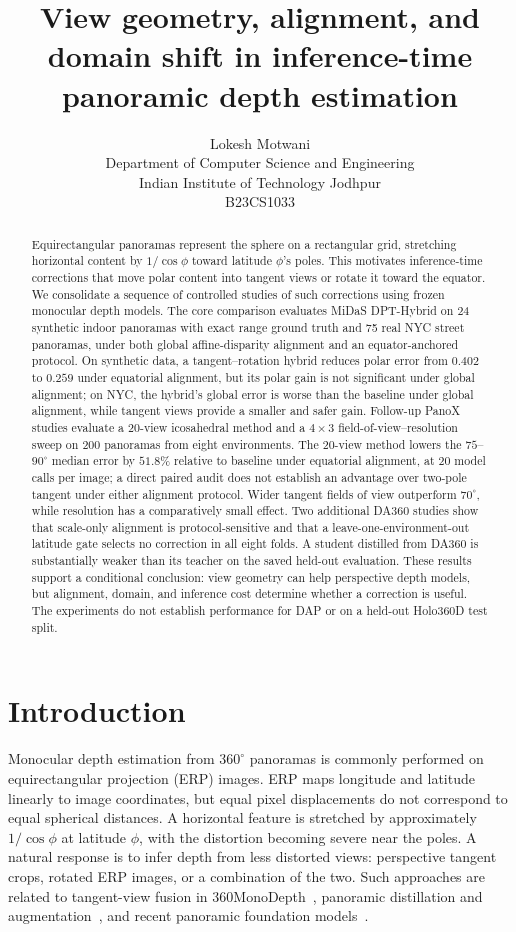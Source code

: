 \documentclass{article}
\title{View geometry, alignment, and domain shift in inference-time panoramic depth estimation}
\author{Lokesh Motwani \\
Department of Computer Science and Engineering \\
Indian Institute of Technology Jodhpur \\
B23CS1033}
\begin{document}
\maketitle

\begin{abstract}
Equirectangular panoramas represent the sphere on a rectangular grid, stretching horizontal content by $1/\cos\phi$ toward latitude $\phi$'s poles. This motivates inference-time corrections that move polar content into tangent views or rotate it toward the equator. We consolidate a sequence of controlled studies of such corrections using frozen monocular depth models. The core comparison evaluates MiDaS DPT-Hybrid on 24 synthetic indoor panoramas with exact range ground truth and 75 real NYC street panoramas, under both global affine-disparity alignment and an equator-anchored protocol. On synthetic data, a tangent--rotation hybrid reduces polar error from $0.402$ to $0.259$ under equatorial alignment, but its polar gain is not significant under global alignment; on NYC, the hybrid's global error is worse than the baseline under global alignment, while tangent views provide a smaller and safer gain. Follow-up PanoX studies evaluate a 20-view icosahedral method and a $4\times3$ field-of-view--resolution sweep on 200 panoramas from eight environments. The 20-view method lowers the $75$--$90^\circ$ median error by $51.8\%$ relative to baseline under equatorial alignment, at 20 model calls per image; a direct paired audit does not establish an advantage over two-pole tangent under either alignment protocol. Wider tangent fields of view outperform $70^\circ$, while resolution has a comparatively small effect. Two additional DA360 studies show that scale-only alignment is protocol-sensitive and that a leave-one-environment-out latitude gate selects no correction in all eight folds. A student distilled from DA360 is substantially weaker than its teacher on the saved held-out evaluation. These results support a conditional conclusion: view geometry can help perspective depth models, but alignment, domain, and inference cost determine whether a correction is useful. The experiments do not establish performance for DAP or on a held-out Holo360D test split.
\end{abstract}

\section{Introduction}

Monocular depth estimation from $360^\circ$ panoramas is commonly performed on equirectangular projection (ERP) images. ERP maps longitude and latitude linearly to image coordinates, but equal pixel displacements do not correspond to equal spherical distances. A horizontal feature is stretched by approximately $1/\cos\phi$ at latitude $\phi$, with the distortion becoming severe near the poles. A natural response is to infer depth from less distorted views: perspective tangent crops, rotated ERP images, or a combination of the two. Such approaches are related to tangent-view fusion in 360MonoDepth~\citep{rey2022}, panoramic distillation and augmentation~\citep{wang2024, cao2024panda}, and recent panoramic foundation models~\citep{lin2025dap,jiang2025da360}.
\end{document}
